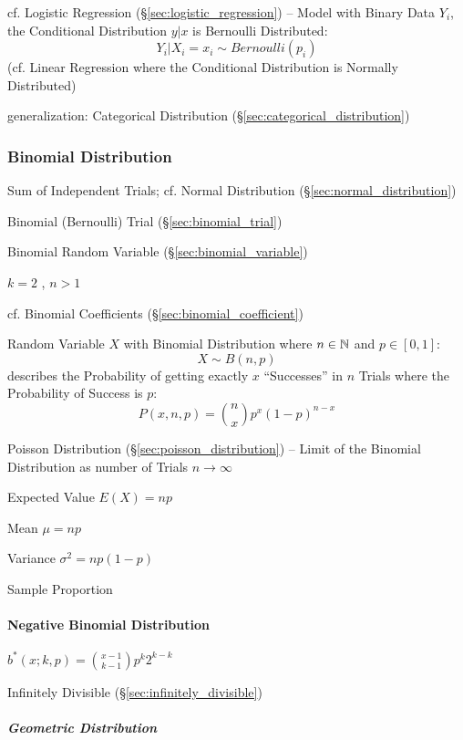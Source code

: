 \fist cf. Logistic Regression (\S\ref{sec:logistic_regression}) -- Model with
Binary Data $Y_i$, the Conditional Distribution $y | x$ is Bernoulli
Distributed:
\[
  Y_i | X_i = x_i \sim Bernoulli(p_i)
\]
(cf. Linear Regression where the Conditional Distribution is Normally
Distributed)

generalization: Categorical Distribution (\S\ref{sec:categorical_distribution})



\subsubsection{Binomial Distribution}\label{sec:binomial_distribution}

Sum of Independent Trials; cf. Normal Distribution
(\S\ref{sec:normal_distribution})

Binomial (Bernoulli) Trial (\S\ref{sec:binomial_trial})

Binomial Random Variable (\S\ref{sec:binomial_variable})

$k = 2$ , $n > 1$

cf. Binomial Coefficients (\S\ref{sec:binomial_coefficient})

Random Variable $X$ with Binomial Distribution where $n \in \mathbb{N}$ and
$p \in [0,1]$:
\[
  X \sim B(n,p)
\]
describes the Probability of getting exactly $x$ ``Successes'' in $n$ Trials
where the Probability of Success is $p$:
\[
  P(x,n,p) = \binom{n}{x}p^x(1-p)^{n-x}
\]

\fist Poisson Distribution (\S\ref{sec:poisson_distribution}) -- Limit of the
Binomial Distribution as number of Trials $n \to \infty$

Expected Value $E(X) = np$

Mean $\mu = n p$

Variance $\sigma^2 = n p (1-p)$

Sample Proportion %



\paragraph{Negative Binomial Distribution}\label{sec:negative_binomial}\hfill

$b^*(x; k,p) = \binom{x-1}{k-1} p^k 2^{k-k}$

Infinitely Divisible (\S\ref{sec:infinitely_divisible})



\subparagraph{Geometric Distribution}\label{sec:geometric_distribution}\hfill

